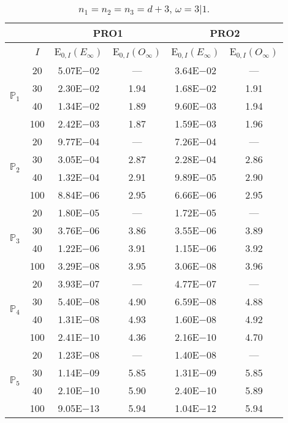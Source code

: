 \begin{table}[H]
\caption{$n_1=n_2=n_3=d+3$, $\omega=3|1$.}
\setlength{\tabcolsep}{5pt}
\centering
\begin{tabular}{@{}l c c c c c@{}}
\toprule
 &  & \multicolumn{2}{c}{PRO1} & \multicolumn{2}{c}{PRO2}\\
\midrule
 & $I$ & E$_{0,I}(E_{\infty})$ & E$_{0,I}(O_{\infty})$ & E$_{0,I}(E_{\infty})$ & E$_{0,I}(O_{\infty})$\\
\midrule
\multirow{4}{*}{$\mathbb{P}_{1}$}
 & 20 & 5.07E$-$02 & --- & 3.64E$-$02 & ---\\
 & 30 & 2.30E$-$02 & 1.94 & 1.68E$-$02 & 1.91 \\
 & 40 & 1.34E$-$02 & 1.89 & 9.60E$-$03 & 1.94 \\
 & 100 & 2.42E$-$03 & 1.87 & 1.59E$-$03 & 1.96 \\
\midrule
\multirow{4}{*}{$\mathbb{P}_{2}$}
 & 20 & 9.77E$-$04 & --- & 7.26E$-$04 & ---\\
 & 30 & 3.05E$-$04 & 2.87 & 2.28E$-$04 & 2.86 \\
 & 40 & 1.32E$-$04 & 2.91 & 9.89E$-$05 & 2.90 \\
 & 100 & 8.84E$-$06 & 2.95 & 6.66E$-$06 & 2.95 \\
\midrule
\multirow{4}{*}{$\mathbb{P}_{3}$}
 & 20 & 1.80E$-$05 & --- & 1.72E$-$05 & ---\\
 & 30 & 3.76E$-$06 & 3.86 & 3.55E$-$06 & 3.89 \\
 & 40 & 1.22E$-$06 & 3.91 & 1.15E$-$06 & 3.92 \\
 & 100 & 3.29E$-$08 & 3.95 & 3.06E$-$08 & 3.96 \\
\midrule
\multirow{4}{*}{$\mathbb{P}_{4}$}
 & 20 & 3.93E$-$07 & --- & 4.77E$-$07 & ---\\
 & 30 & 5.40E$-$08 & 4.90 & 6.59E$-$08 & 4.88 \\
 & 40 & 1.31E$-$08 & 4.93 & 1.60E$-$08 & 4.92 \\
 & 100 & 2.41E$-$10 & 4.36 & 2.16E$-$10 & 4.70 \\
\midrule
\multirow{4}{*}{$\mathbb{P}_{5}$}
 & 20 & 1.23E$-$08 & --- & 1.40E$-$08 & ---\\
 & 30 & 1.14E$-$09 & 5.85 & 1.31E$-$09 & 5.85 \\
 & 40 & 2.10E$-$10 & 5.90 & 2.40E$-$10 & 5.89 \\
 & 100 & 9.05E$-$13 & 5.94 & 1.04E$-$12 & 5.94 \\
\bottomrule
\end{tabular}
\label{Table:PRO:Rodrigo:Test14}
\end{table}
